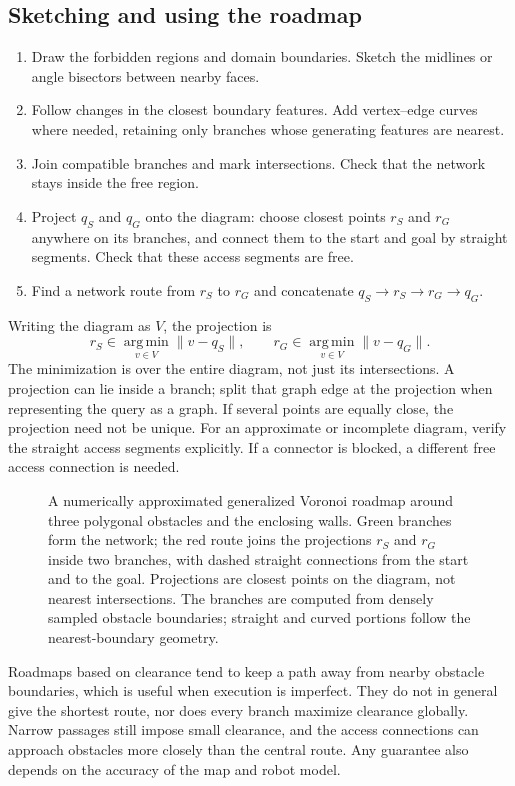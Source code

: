 \subsection{Sketching and using the roadmap}
\begin{enumerate}
\item Draw the forbidden regions and domain boundaries. Sketch the
midlines or angle bisectors between nearby faces.
\item Follow changes in the closest boundary features. Add vertex--edge
curves where needed, retaining only branches whose generating features
are nearest.
\item Join compatible branches and mark intersections. Check that the
network stays inside the free region.
\item Project $q_S$ and $q_G$ onto the diagram: choose closest points
$r_S$ and $r_G$ anywhere on its branches, and connect them to the start
and goal by straight segments. Check that these access segments are free.
\item Find a network route from $r_S$ to $r_G$ and concatenate
$q_S\to r_S\to r_G\to q_G$.
\end{enumerate}
Writing the diagram as $V$, the projection is
\[
 r_S\in\operatorname*{arg\,min}_{v\in V}\|v-q_S\|,\qquad
 r_G\in\operatorname*{arg\,min}_{v\in V}\|v-q_G\|.
\]
The minimization is over the entire diagram, not just its intersections.
A projection can lie inside a branch; split that graph edge at the
projection when representing the query as a graph. If several points are
equally close, the projection need not be unique. For an approximate or
incomplete diagram, verify the straight access segments explicitly. If a
connector is blocked, a different free access connection is needed.

\begin{figure}[htbp]
\centering
\caption{A numerically approximated generalized Voronoi roadmap around three polygonal
obstacles and the enclosing walls. Green branches form the network;
the red route joins the projections $r_S$ and $r_G$ inside two branches,
with dashed straight connections from the start and to the goal.
Projections are closest points on the diagram, not nearest intersections.
The branches are computed from densely sampled obstacle boundaries;
straight and curved portions follow the nearest-boundary geometry.}
\label{fig:l13-roadmap}
\end{figure}

Roadmaps based on clearance tend to keep a path away from nearby obstacle
boundaries, which is useful when execution is imperfect. They do not in
general give the shortest route, nor does every branch maximize clearance
globally. Narrow passages still impose small clearance, and the access
connections can approach obstacles more closely than the central route.
Any guarantee also depends on the accuracy of the map and robot model.

